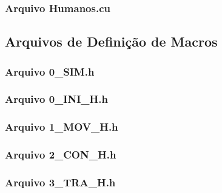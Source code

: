 \newpage

\subsubsection{Arquivo Humanos.cu}



\newpage

\subsection{Arquivos de Definição de Macros}

\subsubsection{Arquivo 0\_SIM.h}



\newpage

\subsubsection{Arquivo 0\_INI\_H.h}



\newpage

\subsubsection{Arquivo 1\_MOV\_H.h}



\newpage

\subsubsection{Arquivo 2\_CON\_H.h}



\newpage

\subsubsection{Arquivo 3\_TRA\_H.h}

